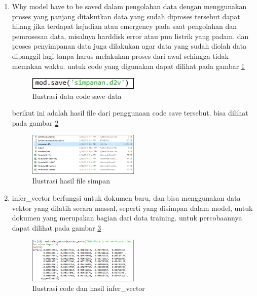 \begin{enumerate}
\item Why model have to be saved
\subitem dalam pengolahan data dengan menggunakan proses yang panjang ditakutkan data yang sudah diproses tersebut dapat hilang jika terdapat kejadian atau emergency pada saat pengolahan dan pemrosesan data, misalnya harddisk error atau pun listrik yang padam. dan proses penyimpanan data juga dilakukan agar data yang sudah diolah data dipanggil lagi tanpa harus melakukan proses dari awal sehingga tidak memakan waktu. untuk code yang digunakan dapat dilihat pada gambar \ref{d32}

\begin{figure}[!htbp]
	\centering
	\includegraphics[width=0.5\textwidth]{figures/fathi/chapter5/hari3/12}
	\caption{Ilustrasi data code save data}
	\label{d32}
\end{figure}

berikut ini adalah hasil file dari penggunaan code save tersebut. bisa dilihat pada gambar \ref{d33}
\begin{figure}[!htbp]
	\centering
	\includegraphics[width=0.5\textwidth]{figures/fathi/chapter5/hari3/13}
	\caption{Ilustrasi hasil file simpan}
	\label{d33}
\end{figure}

\item infer\_vector
\subitem berfungsi untuk dokumen baru, dan  bisa menggunakan data vektor yang dilatih secara massal, seperti yang disimpan dalam model, untuk dokumen yang merupakan bagian dari data training. untuk percobaannya dapat dilihat pada gambar \ref{d34}
\begin{figure}[!htbp]
	\centering
	\includegraphics[width=0.5\textwidth]{figures/fathi/chapter5/hari3/14}
	\caption{Ilustrasi code dan hasil infer\_vector}
	\label{d34}
\end{figure}


\end{enumerate}
